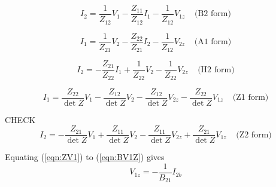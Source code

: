 \documentclass[a4paper, 12pt]{article}
\newcommand{\bigspace}{\;\;\;\;}
\newcommand{\refeqn}[1]{\mbox{(\ref{eqn:#1})}}
\begin{document}
\begin{equation}
  I_2 = \frac{1}{Z_{12}} V_1 - \frac{Z_{11}}{Z_{12}} I_1 - \frac{1}{Z_{12}} V_{1z} \bigspace \mbox{(B2 form)}
\end{equation}

\begin{equation}
  I_1 = \frac{1}{Z_{21}} V_2 - \frac{Z_{22}}{Z_{21}} I_2 - \frac{1}{Z_{12}} V_{2z} \bigspace \mbox{(A1 form)}
\end{equation}


\begin{equation}
  I_2 = -\frac{Z_{21}}{Z_{22}} I_1 + \frac{1}{Z_{22}} V_2 - \frac{1}{Z_{22}} V_{2z} \bigspace \mbox{(H2 form)}
\end{equation}


\begin{equation}
  I_1 = \frac{Z_{22}}{\det{Z}} V_1 - \frac{Z_{12}}{\det{Z}} V_2 - \frac{Z_{12}}{\det{Z}} V_{2z} - \frac{Z_{22}}{\det{Z}} V_{1z} \bigspace \mbox{(Z1 form)}
\end{equation}

CHECK
\begin{equation}
  I_2 = -\frac{Z_{21}}{\det{Z}} V_1 + \frac{Z_{11}}{\det{Z}} V_2 - \frac{Z_{11}}{\det{Z}} V_{2z} + \frac{Z_{21}}{\det{Z}} V_{1z} \bigspace \mbox{(Z2 form)}
\end{equation}


Equating \refeqn{ZV1} to \refeqn{BV1Z} gives
%
\begin{equation}
  V_{1z} = -\frac{1}{B_{21}} I_{2b}
\end{equation}





\end{document}
